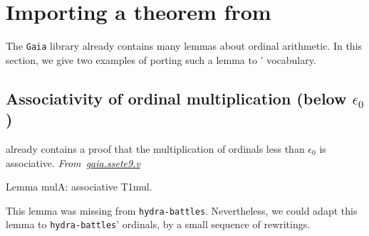   
 







\section{Importing a theorem from \gaia}
\label{sect:gaia2hydra}

The \texttt{Gaia} library already contains many lemmas about
ordinal arithmetic. In this section, we give two examples of
porting such a lemma to \HydrasLib' vocabulary.

\subsection{Associativity of ordinal multiplication (below \texorpdfstring{$\epsilon_0$}{epsilon\_0})}
\gaia already contains a proof that the multiplication of ordinals less than $\epsilon_0$ is associative.
\emph{From~\href{https://github.com/coq-community/gaia/blob/master/theories/ssete9.v}{gaia.ssete9.v}}

\begin{Coqsrc}
Lemma mulA: associative T1mul.
\end{Coqsrc}

This lemma was missing from \texttt{hydra-battles}. Nevertheless, we could adapt this lemma to \texttt{hydra-battles}' ordinals, by a small sequence of rewritings.

